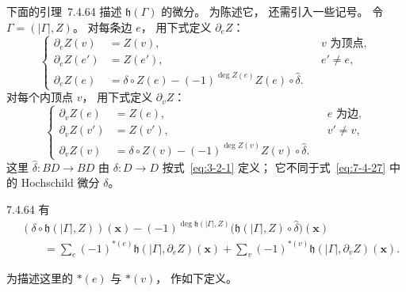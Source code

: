 下面的引理~7.4.64
描述 $\mathfrak h(\Gamma)$
的微分。
为陈述它，
还需引入一些记号。
令 $\Gamma=(|\Gamma|,Z)$。
对每条边 $e$，
用下式定义 $\partial_eZ$：
\begin{equation}
\left\{
\begin{aligned}
\partial_eZ(v)&=Z(v),
&&\text{$v$ 为顶点},\\
\partial_eZ(e')&=Z(e'),
&&e'\ne e,\\
\partial_eZ(e)
&=\delta\circ Z(e)
-(-1)^{\deg Z(e)}
Z(e)\circ\widehat\delta.
\end{aligned}
\right.
\tag{7.4.62}\label{eq:7-4-62}
\end{equation}
对每个内顶点 $v$，
用下式定义 $\partial_vZ$：
\begin{equation}
\left\{
\begin{aligned}
\partial_vZ(e)&=Z(e),
&&\text{$e$ 为边},\\
\partial_vZ(v')&=Z(v'),
&&v'\ne v,\\
\partial_vZ(v)
&=\delta\circ Z(v)
-(-1)^{\deg Z(v)}
Z(v)\circ\widehat\delta.
\end{aligned}
\right.
\tag{7.4.63}\label{eq:7-4-63}
\end{equation}
这里
$\widehat\delta\colon BD\to BD$
由
$\delta\colon D\to D$
按式~\eqref{eq:3-2-1}
定义；
它不同于式~\eqref{eq:7-4-27}
中的 Hochschild 微分
$\delta$。

\begin{lemma}{7.4.64}\label{lem:7-4-64}
有
\[
\begin{aligned}
&(\delta\circ
\mathfrak h(|\Gamma|,Z))(\mathbf x)
-(-1)^{\deg\mathfrak h(|\Gamma|,Z)}
\bigl(
\mathfrak h(|\Gamma|,Z)
\circ\widehat\delta
\bigr)(\mathbf x)\\
&\qquad=
\sum_e(-1)^{*(e)}
\mathfrak h(|\Gamma|,\partial_eZ)
(\mathbf x)
+\sum_v(-1)^{*(v)}
\mathfrak h(|\Gamma|,\partial_vZ)
(\mathbf x).
\end{aligned}
\]
\end{lemma}

为描述这里的
$*(e)$ 与 $*(v)$，
作如下定义。

